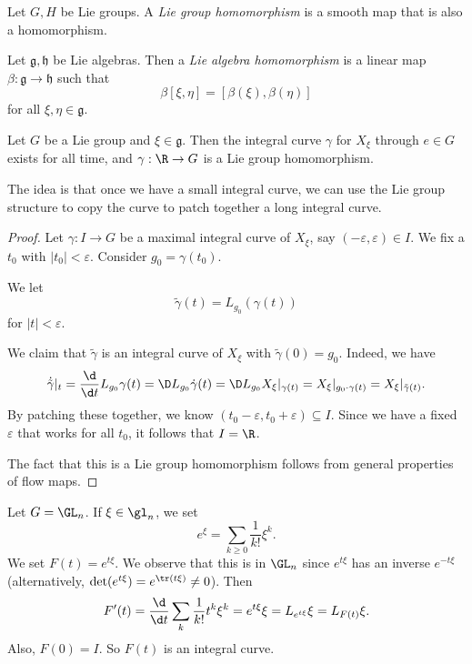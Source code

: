 \documentclass[a4paper]{article}
\begin{document}
\begin{defi}
  Let $G, H$ be Lie groups. A \emph{Lie group homomorphism} is a smooth map that is also a homomorphism.
\end{defi}

\begin{defi}
  Let $\mathfrak{g}, \mathfrak{h}$ be Lie algebras. Then a \emph{Lie algebra homomorphism} is a linear map $\beta: \mathfrak{g} \to \mathfrak{h}$ such that
  \[
    \beta[\xi,\eta] = [\beta(\xi), \beta(\eta)]
  \]
  for all $\xi,\eta \in \mathfrak{g}$.
\end{defi}

\begin{prop}
  Let $G$ be a Lie group and $\xi \in \mathfrak{g}$. Then the integral curve $\gamma$ for $X_\xi$ through $e \in G$ exists for all time, and $\gamma: \R \to G$ is a Lie group homomorphism.
\end{prop}

The idea is that once we have a small integral curve, we can use the Lie group structure to copy the curve to patch together a long integral curve.
\begin{proof}
  Let $\gamma: I \to G$ be a maximal integral curve of $X_\xi$, say $(-\varepsilon, \varepsilon) \in I$. We fix a $t_0$ with $|t_0| < \varepsilon$. Consider $g_0 = \gamma(t_0)$.

  We let
  \[
    \tilde{\gamma}(t) = L_{g_0}(\gamma(t))
  \]
  for $|t| < \varepsilon$.

  We claim that $\tilde{\gamma}$ is an integral curve of $X_\xi$ with $\tilde{\gamma}(0) = g_0$. Indeed, we have
  \[
    \dot{\tilde{\gamma}}|_t = \frac{\d}{\d t} L_{g_0}\gamma(t) = \D L_{g_0} \dot{\gamma}(t) = \D L_{g_0} X_\xi|_{\gamma(t)} = X_\xi|_{g_0 \cdot \gamma(t)} = X_\xi|_{\tilde{\gamma}(t)}.
  \]
  By patching these together, we know $(t_0 - \varepsilon, t_0 + \varepsilon) \subseteq I$. Since we have a fixed $\varepsilon$ that works for all $t_0$, it follows that $I = \R$.

  The fact that this is a Lie group homomorphism follows from general properties of flow maps.
\end{proof}

\begin{eg}
  Let $G = \GL_n$. If $\xi \in \gl_n$, we set
  \[
    e^\xi = \sum_{k \geq 0} \frac{1}{k!} \xi^k.
  \]
  We set $F(t) = e^{t \xi}$. We observe that this is in $\GL_n$ since $e^{t\xi}$ has an inverse $e^{-t\xi}$ (alternatively, $\det (e^{t\xi}) = e^{\tr (t\xi)} \not= 0$). Then
  \[
    F'(t) = \frac{\d}{\d t} \sum_k \frac{1}{k!} t^k \xi^k = e^{t\xi} \xi = L_{e^{t\xi}}\xi = L_{F(t)}\xi.
  \]
  Also, $F(0) = I$. So $F(t)$ is an integral curve.
\end{eg}
\end{document}
